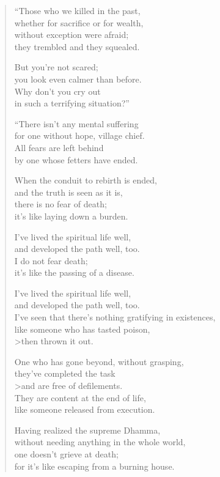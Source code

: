 \documentclass[12pt,openany]{book}%
\begin{document}
\begin{verse}%
“Those who we killed in the past, \\
whether for sacrifice or for wealth, \\
without exception were afraid; \\
they trembled and they squealed. 

But you’re not scared; \\
you look even calmer than before. \\
Why don’t you cry out \\
in such a terrifying situation?” 

“There isn’t any mental suffering \\
for one without hope, village chief. \\
All fears are left behind \\
by one whose fetters have ended. 

When the conduit to rebirth is ended, \\
and the truth is seen as it is, \\
there is no fear of death; \\
it’s like laying down a burden. 

I’ve lived the spiritual life well, \\
and developed the path well, too. \\
I do not fear death; \\
it’s like the passing of a disease. 

I’ve lived the spiritual life well, \\
and developed the path well, too. \\
I’ve seen that there’s nothing gratifying in existences, \\
like someone who has tasted poison, \\>then thrown it out. 

One who has gone beyond, without grasping, \\
they’ve completed the task \\>and are free of defilements. \\
They are content at the end of life, \\
like someone released from execution. 

Having realized the supreme Dhamma, \\
without needing anything in the whole world, \\
one doesn’t grieve at death; \\
for it’s like escaping from a burning house. 


\end{verse}
\end{document}

